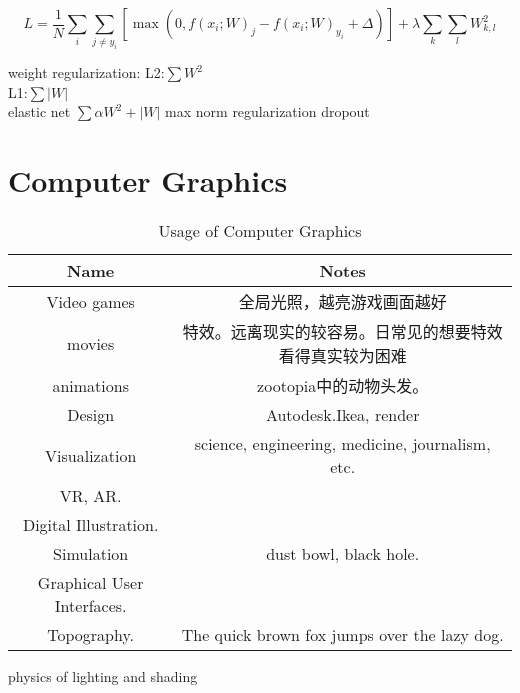 \documentclass[UTF8]{book}
\begin{document}
    \begin{equation}
        L = \frac{1}{N} \sum_i \sum_{j\neq y_i} \left[ \max(0, f(x_i; W)_j - f(x_i; W)_{y_i} + \Delta) \right] + \lambda \sum_k\sum_l W_{k,l}^2
    \end{equation}
     
%

    weight regularization:
    L2:$\sum W^2$\\
    L1:$\sum |W|$\\
    elastic net $\sum \alpha W^2+|W|$
    max norm regularization
    dropout 



\chapter{Computer Graphics}



\begin{table}[htbp]
    \newcommand{\tabincell}[2]{\begin{tabular}{@{}#1@{}}#2\end
    {tabular}}
    \centering
      \caption{Usage of Computer Graphics }
      \label{tab:label}
        \begin{tabular}{cc}
        \toprule
        Name & Notes\\
        \midrule

        Video games & 全局光照，越亮游戏画面越好\\
        movies & 特效。远离现实的较容易。日常见的想要特效看得真实较为困难\\
        animations &zootopia中的动物头发。\\
        Design & Autodesk.Ikea, render\\
        Visualization  &science, engineering, medicine, journalism, etc.\\
        VR, AR.&\\
        Digital Illustration.&\\
        Simulation & dust bowl, black hole.\\
        Graphical User Interfaces.&\\
        Topography.& The quick brown fox jumps over the lazy dog.\\

        \bottomrule
        \end{tabular}
\end{table}


physics of lighting and shading
\end{document}
